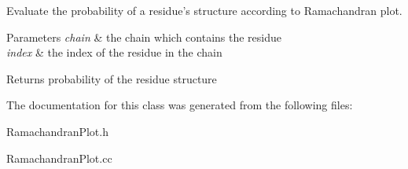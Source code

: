 Evaluate the probability of a residue's structure according to Ramachandran plot. 


\begin{DoxyParams}{Parameters}
{\em chain} & the chain which contains the residue \\
\hline
{\em index} & the index of the residue in the chain \\
\hline
\end{DoxyParams}
\begin{DoxyReturn}{Returns}
probability of the residue structure 
\end{DoxyReturn}


The documentation for this class was generated from the following files\-:\begin{DoxyCompactItemize}
\item 
Ramachandran\-Plot.\-h\item 
Ramachandran\-Plot.\-cc\end{DoxyCompactItemize}
